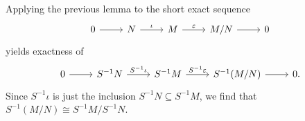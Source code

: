 Applying the previous lemma to the short exact sequence
\[\begin{tikzcd}
0 \arrow[r] & N \arrow[r, "\iota"] & M \arrow[r, "\varepsilon"] & M/N \arrow[r] & 0
\end{tikzcd}\]
yields exactness of
\[\begin{tikzcd}
	0 \arrow[r] & S^{-1}N \arrow[r, "S^{-1}\iota"] & S^{-1}M \arrow[r, "S^{-1}\varepsilon"] & S^{-1}(M/N) \arrow[r] & 0.
\end{tikzcd}\]
Since $S^{-1}\iota$ is just the inclusion $S^{-1}N \subseteq S^{-1}M$, we find
that $S^{-1}(M/N) \cong S^{-1}M/S^{-1}N$.
